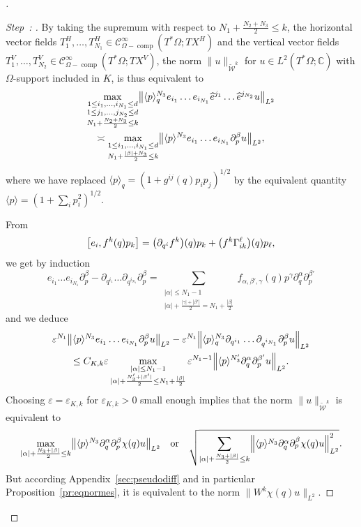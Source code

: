 \documentclass[10pt]{amsart}
\theoremstyle{definition}\newtheorem{defi}[theo]{Definition}\newtheorem{rema}[theo]{Remark}\newtheorem{exam}[theo]{Example}\newtheorem{exem}[theo]{Example}\newtheorem{nota}[theo]{Notation}
\newcommand{\C}{\mathbb{C}}
\newcommand{\clW}{\mathcal{W}}
\newcommand{\clC}{\mathcal{C}}
\DeclareMathOperator{\ccomp}{comp}
\let\oldhat\hat
\renewcommand*{\hat}[1]{\mathchoice{\widehat{#1}}{\widehat{#1}}{\oldhat{#1}}{\oldhat{#1}}}
\let\originalleft\left
\let\originalright\right
\renewcommand{\left}{\mathopen{}\mathclose\bgroup\originalleft}
\renewcommand{\right}{\aftergroup\egroup\originalright}
\newcounter{setofstep}
\newcounter{step}[setofstep]
\renewcommand{\thestep}{\Alph{step}}
\newenvironment{step}[1][]{\refstepcounter{step}\begin{proof}[{Step~\thestep\if#1\empty\else: #1\fi}]}{\let\qed\relax\end{proof}}
\newenvironment{proofc}[1][\proofname]{\begin{proof}[#1]}{\end{proof}}
\begin{document}
\begin{proofc}
\begin{step}
By taking the supremum with respect to $N_{1}+\frac{N_{2}+N_{3}}{2}\leq k$, the horizontal vector fields $T_{1}^{H},\dots, T_{N_{1}}^{H}\in \clC^{\infty}_{\Omega-\ccomp}(T^{*}\Omega;TX^{H})$ and the vertical vector fields $T_{1}^{V},\dots, T_{N_{2}}^{V}\in \clC^{\infty}_{\Omega-\ccomp}(T^{*}\Omega;TX^{V})$, the norm $\|u\|_{\widetilde{\clW}^{k}}$ for $u\in L^{2}(T^{*}\Omega;\C)$ with $\Omega$-support included in $K$, is thus equivalent to
\begin{multline}\label{eq:normmax}
\max_{\substack{1\leq i_{1},\dots,i_{N_{1}}\leq d\\ 1\leq j_{1},\dots,j_{N_{2}}\leq d\\ N_{1}+\frac{N_{2}+N_{3}}{2}\leq k}}\left\|\langle p\rangle_{q}^{N_{3}}e_{i_{1}}\dots e_{i_{N_{1}}}\hat{e}^{j_{1}}\dots \hat{e}^{j_{N_{2}}}u\right\|_{L^{2}}\\
\asymp
\max_{\substack{1\leq i_{1},\dots,i_{N_{1}}\leq d\\ N_{1}+\frac{|\beta|+N_{3}}{2}\leq k}}
\left\|\langle p\rangle^{N_{3}}e_{i_{1}}\dots e_{i_{N_{1}}}\partial_{p}^{\beta}u\right\|_{L^{2}},
\end{multline}
where we have replaced $\langle p\rangle_{q}=(1+g^{ij}(q)p_{i}p_{j})^{1/2}$ by the equivalent quantity $\langle p\rangle=(1+\sum_{i}p_{i}^{2})^{1/2}$.

From
\[
\left[e_{i},f^{k}(q)p_{k}\right]=\left(\partial_{q^{i}}f^{k}\right)(q)p_{k}+\left(f^{k}\Gamma_{ik}^{\ell}\right)(q)p_{\ell},
\]
we get by induction
\[
e_{i_{1}}\dots e_{i_{N_{1}}}\partial_{p}^{\beta}-\partial_{q^{i_{1}}}\dots\partial_{q^{i_{N_{1}}}}\partial_{p}^{\beta}=\sum_{\substack{|\alpha|\leq N_{1}-1\\ |\alpha|+\frac{|\gamma|+|\beta'|}{2}=N_{1}+\frac{|\beta|}{2}}}f_{\alpha,\beta',\gamma}(q)p^{\gamma}\partial_{q}^{\alpha}\partial_{p}^{\beta'}
\]
and we deduce
\begin{multline*}
\varepsilon^{N_{1}}\left\|\langle p\rangle^{N_{3}}e_{i_{1}}\dots e_{i_{N_{1}}}\partial^{\beta}_{p}u\right\|_{L^{2}}-\varepsilon^{N_{1}}\left\|\langle p\rangle_{q}^{N_{3}}\partial_{q^{i_{1}}}\dots \partial_{q^{i_{N_{1}}}}\partial^{\beta}_{p}u\right\|_{L^{2}}
\\
\leq C_{K,k}\varepsilon\max_{\substack{|\alpha|\leq N_{1}-1\\
|\alpha|+\frac{N_{3}'+|\beta'|}{2}\leq N_{1}+\frac{|\beta|}{2}}}\varepsilon^{N_{1}-1}\left\|\langle p\rangle^{N_{3}'}\partial_{q}^{\alpha}\partial_{p}^{\beta'}u\right\|_{L^{2}}.
\end{multline*}
Choosing $\varepsilon=\varepsilon_{K,k}$ for $\varepsilon_{K,k}>0$ small enough implies that the norm $\|u\|_{\widetilde{\clW}^{k}}$ is equivalent to
\[
\max_{|\alpha|+\frac{N_{3}+|\beta|}{2}\leq k}\left\|\langle p\rangle^{N_{3}}\partial_{q}^{\alpha}\partial_{p}^{\beta}\chi(q)u\right\|_{L^{2}}
\quad\text{or}
\quad \sqrt{\sum_{|\alpha|+\frac{N_{3}+|\beta|}{2}\leq k}\left\|\langle p\rangle^{N_{3}}\partial_{q}^{\alpha}\partial_{p}^{\beta}\chi(q)u\right\|^{2}_{L^{2}}}.
\]
But according Appendix~\ref{sec:pseudodiff} and in particular Proposition~\ref{pr:eqnormes}, it is equivalent to the norm $\|W^{k}\chi(q)u\|_{L^{2}}$.\qedhere
\end{step}\let\qed\relax
\end{proofc}
\end{document}
